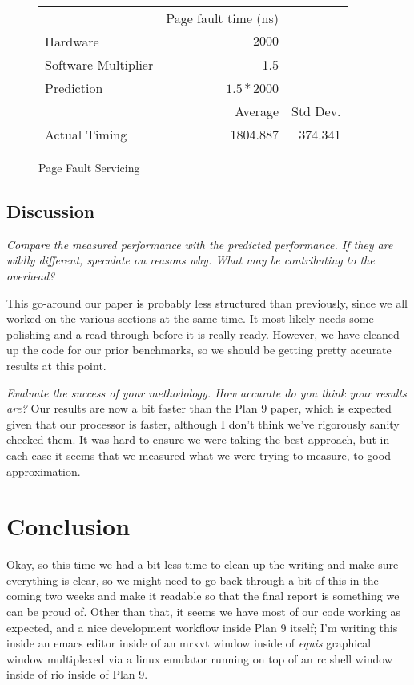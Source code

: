 \documentclass[letterpaper,twocolumn,10pt]{article}
\begin{document}
\begin{figure}
	\centering
    \begin{tabular}{l r r}
      & Page fault time (ns) \\
      Hardware & $2000$\\
      Software Multiplier & 1.5 \\
      Prediction & $1.5 * 2000$ \\
                   & Average & Std Dev.\\
      Actual Timing & 1804.887 & 374.341 \\
\end{tabular}
\caption{Page Fault Servicing}
\label{tab:pagefault}
\end{figure}

\subsection{Discussion}
\textit{Compare the measured performance with the predicted performance. If they are wildly different, speculate on reasons why. What may be contributing to the overhead?}

This go-around our paper is probably less structured than previously, since we all worked on the various sections at the same time. It most likely needs some polishing and a read through before it is really ready. However, we have cleaned up the code for our prior benchmarks, so we should be getting pretty accurate results at this point.

    
    \textit{Evaluate the success of your methodology. How accurate do you think your results are?}
    Our results are now a bit faster than the Plan 9 paper, which is expected given that our processor is faster, although I don't think we've rigorously sanity checked them. It was hard to ensure we were taking the best approach, but in each case it seems that we measured what we were trying to measure, to good approximation.

\section{Conclusion}

Okay, so this time we had a bit less time to clean up the writing and make sure everything is clear, so we might need to go back through a bit of this in the coming two weeks and make it readable so that the final report is something we can be proud of. Other than that, it seems we have most of our code working as expected, and a nice development workflow inside Plan 9 itself; I'm writing this inside an emacs editor inside of an mrxvt window inside of \textit{equis} graphical window multiplexed via a linux emulator running on top of an rc shell window inside of rio inside of Plan 9. \\
\end{document}
